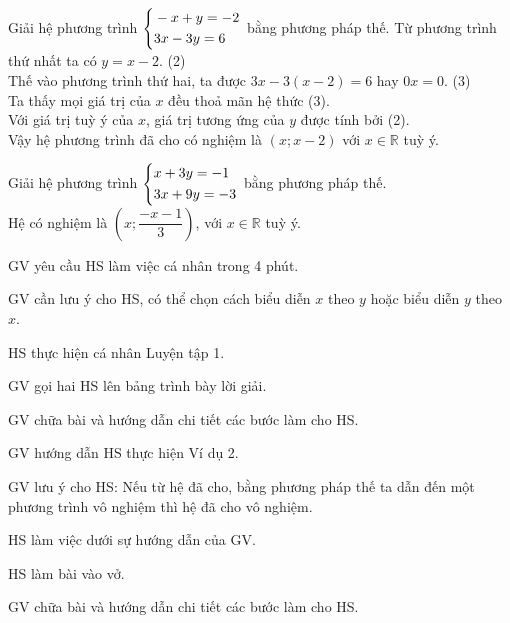 \begin{vidu}
    Giải hệ phương trình $\left\{\begin{aligned}&-x + y = -2 \\ &3x - 3y = 6\end{aligned}\right.$ bằng phương pháp thế.
    \doicot
    Từ phương trình thứ nhất ta có $y = x - 2$. \quad (2)\\
    Thế vào phương trình thứ hai, ta được $3x - 3(x - 2) = 6$ hay $0x = 0$. \quad (3)\\
    Ta thấy mọi giá trị của $x$ đều thoả mãn hệ thức (3).\\
    Với giá trị tuỳ ý của $x$, giá trị tương ứng của $y$ được tính bởi (2).\\
    Vậy hệ phương trình đã cho có nghiệm là $(x; x - 2)$ với $x \in \mathbb{R}$ tuỳ ý.
\end{vidu}

\begin{luyentap}
    Giải hệ phương trình $\left\{\begin{aligned}&x + 3y = -1 \\ &3x + 9y = -3\end{aligned}\right.$ bằng phương pháp thế.
    \doicot
    \huongdan\\
    Hệ có nghiệm là $\left(x;\dfrac{-x-1}{3}\right)$, với $x\in\mathbb{R}$ tuỳ ý.
\end{luyentap}

\tochucthuchien

\begin{tcth}[luyentap=1]
    \buocmot
    \item GV yêu cầu HS làm việc cá nhân trong 4 phút.
    \item GV cần lưu ý cho HS, có thể chọn cách biểu diễn $x$ theo $y$ hoặc biểu diễn $y$ theo $x$. 
    \buochai
    \item HS thực hiện cá nhân Luyện tập 1. 
    \buocba
    \item GV gọi hai HS lên bảng trình bày lời giải.
    \buocbon
    \item GV chữa bài và hướng dẫn chi tiết các bước làm cho HS.
\end{tcth}

\begin{tcth}[vidu=2]
    \buocmot
    \item GV hướng dẫn HS thực hiện Ví dụ 2. 
    \item GV lưu ý cho HS: Nếu từ hệ đã cho, bằng phương pháp thế ta dẫn đến một phương trình vô nghiệm thì hệ đã cho vô nghiệm. 
    \buochai
    \item HS làm việc dưới sự hướng dẫn của GV. 
    \buocba
    \item HS làm bài vào vở.
    \buocbon
    \item GV chữa bài và hướng dẫn chi tiết các bước làm cho HS.
\end{tcth}

